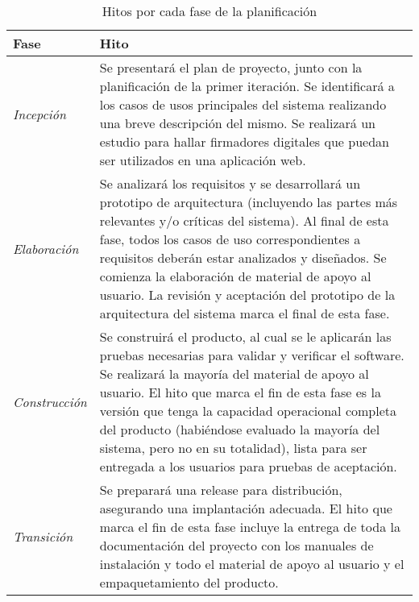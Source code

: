 \begin{table}[h!]
	\begin{center}
	\begin{tabular}{ | p{3cm} | p{12.5cm} | }
		\hline
		\rowcolor{lightgray}
		\hfil \textbf{Fase} &
		\hfil \textbf{Hito} \\
		\hline
		\textit{Incepci\'on} &
		Se presentar\'a el plan de proyecto, junto con
		la planificaci\'on de la primer iteraci\'on.
		Se identificar\'a a los casos de usos principales
		del sistema realizando una breve descripci\'on del
		mismo. Se realizar\'a un estudio para hallar
		firmadores digitales que puedan ser utilizados en
		una aplicaci\'on web.
		\\
		\hline
		\textit{Elaboraci\'on} &
		Se analizar\'a los requisitos y se desarrollar\'a
		un prototipo de arquitectura (incluyendo las partes
		m\'as relevantes y/o cr\'iticas del sistema). Al
		final de esta fase, todos los casos de uso
		correspondientes a requisitos deber\'an estar
		analizados y dise\~nados. Se comienza la
		elaboraci\'on de material de apoyo al usuario. La
		revisi\'on y aceptaci\'on del prototipo de la
		arquitectura del sistema marca el final de esta fase.
		\\
		\hline
		\textit{Construcci\'on} &
		Se construir\'a el producto, al cual se le aplicar\'an
		las pruebas necesarias para validar y verificar el
		software. Se realizar\'a la mayor\'ia del material de
		apoyo al usuario. El hito que marca el fin de esta fase
		es la versi\'on que tenga la capacidad operacional
		completa del producto (habi\'endose evaluado la
		mayor\'ia del sistema, pero no en su totalidad), lista
		para ser entregada a los usuarios para pruebas de
		aceptaci\'on.
		\\
		\hline
		\textit{Transici\'on} &
		Se preparará una release para distribuci\'on,
		asegurando una implantaci\'on adecuada. El hito
		que marca el fin de esta fase incluye la entrega
		de toda la documentaci\'on del proyecto con los
		manuales de instalaci\'on y todo el material de
		apoyo al usuario y el empaquetamiento del producto.
		\\
		\hline
	\end{tabular}
	\end{center}
	\caption{Hitos por cada fase de la planificaci\'on}
\end{table}
\clearpage
